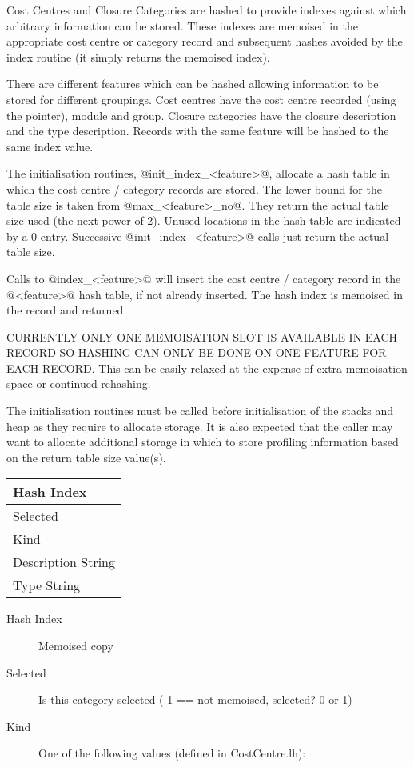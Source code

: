 \documentclass[11pt]{article}
\begin{document}
\begin{itemize}
Cost Centres and Closure Categories are hashed to provide indexes
against which arbitrary information can be stored. These indexes are
memoised in the appropriate cost centre or category record and
subsequent hashes avoided by the index routine (it simply returns the
memoised index).

There are different features which can be hashed allowing information
to be stored for different groupings. Cost centres have the cost
centre recorded (using the pointer), module and group. Closure
categories have the closure description and the type
description. Records with the same feature will be hashed to the same
index value.

The initialisation routines, @init_index_<feature>@, allocate a hash
table in which the cost centre / category records are stored. The
lower bound for the table size is taken from @max_<feature>_no@. They
return the actual table size used (the next power of 2). Unused
locations in the hash table are indicated by a 0 entry. Successive
@init_index_<feature>@ calls just return the actual table size.

Calls to @index_<feature>@ will insert the cost centre / category
record in the @<feature>@ hash table, if not already inserted. The hash
index is memoised in the record and returned. 

CURRENTLY ONLY ONE MEMOISATION SLOT IS AVAILABLE IN EACH RECORD SO
HASHING CAN ONLY BE DONE ON ONE FEATURE FOR EACH RECORD. This can be
easily relaxed at the expense of extra memoisation space or continued
rehashing.

The initialisation routines must be called before initialisation of
the stacks and heap as they require to allocate storage. It is also
expected that the caller may want to allocate additional storage in
which to store profiling information based on the return table size
value(s).

\begin{center}
\begin{tabular}{|l|}
   \hline Hash Index
\\ \hline Selected
\\ \hline Kind
\\ \hline Description String
\\ \hline Type String
\\ \hline
\end{tabular}
\end{center}

\begin{description}
\item[Hash Index] Memoised copy
\item[Selected] 
  Is this category selected (-1 == not memoised, selected? 0 or 1)
\item[Kind]
One of the following values (defined in CostCentre.lh):


\end{description}
\end{itemize}
\end{document}
